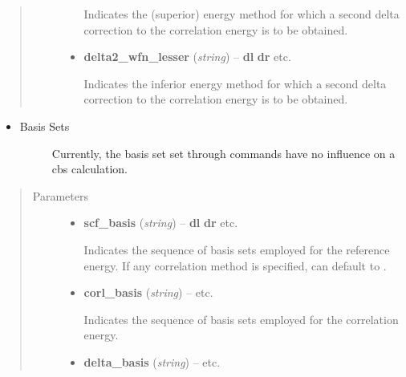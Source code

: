 \documentclass[letterpaper,10pt,english]{sphinxmanual}
\begin{document}
\begin{fulllineitems}
\begin{quote}
\begin{description}
\begin{itemize}
Indicates the (superior) energy method for which a second delta correction
to the correlation energy is to be obtained.


\item {} 
\textbf{delta2\_wfn\_lesser} (\emph{string}) -- 
{\color{red}\bfseries{}\textbar{}dl\textbar{}}  {\color{red}\bfseries{}\textbar{}dr\textbar{}} \textbar{}\textbar{}  \textbar{}\textbar{} etc.

Indicates the inferior energy method for which a second delta correction
to the correlation energy is to be obtained.


\end{itemize}

\end{description}\end{quote}
\begin{itemize}
\item {} \begin{description}
\item[{Basis Sets}] \leavevmode
Currently, the basis set set through  commands have no influence
on a cbs calculation.

\end{description}

\end{itemize}
\begin{quote}\begin{description}
\item[{Parameters}] \leavevmode\begin{itemize}
\item {} 
\textbf{scf\_basis} (\emph{string}) -- 
{\color{red}\bfseries{}\textbar{}dl\textbar{}}  {\color{red}\bfseries{}\textbar{}dr\textbar{}} \textbar{}\textbar{}  \textbar{}\textbar{}  \textbar{}\textbar{}  \textbar{}\textbar{} etc.

Indicates the sequence of basis sets employed for the reference energy.
If any correlation method is specified,  can default
to .


\item {} 
\textbf{corl\_basis} (\emph{string}) -- 
 \textbar{}\textbar{}  \textbar{}\textbar{}  \textbar{}\textbar{} etc.

Indicates the sequence of basis sets employed for the correlation energy.


\item {} 
\textbf{delta\_basis} (\emph{string}) -- 
 \textbar{}\textbar{}  \textbar{}\textbar{}  \textbar{}\textbar{} etc.


\end{itemize}
\end{description}
\end{quote}
\end{fulllineitems}
\end{document}
